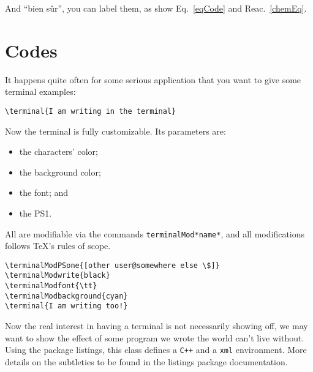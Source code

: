 \documentclass{documentation}
\begin{document}
And ``bien s\^ur'', you can label them, as show Eq.~\ref{eqCode} and
Reac.~\ref{chemEq}.

\section{Codes}

It happens quite often for some serious application that
you want to give some terminal examples:
\begin{verbatim}
\terminal{I am writing in the terminal}
\end{verbatim}


Now the terminal is fully customizable. Its parameters are:
\begin{itemize}
\item the characters' color;
\item the background color;
\item the font; and
\item the PS1.
\end{itemize}
All are modifiable via the commands \verb!terminalMod*name*!,
and all modifications follows \TeX's rules of scope.
{
\begin{verbatim}
\terminalModPSone{[other user@somewhere else \$]}
\terminalModwrite{black}
\terminalModfont{\tt}
\terminalModbackground{cyan}
\terminal{I am writing too!}
\end{verbatim}
\terminalModfont{\tt}
}

Now the real interest in having a terminal is not
necessarily showing off, we may want to show the effect
of some program we wrote the world can't live without.
Using the package \textsf{listings}, this class defines
a \texttt{C++} and a \texttt{xml} environment. More
details on the subtleties to be found in the
\textsf{listings} package documentation.
\end{document}
